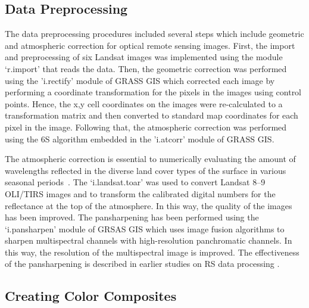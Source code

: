 \documentclass[geomatics,article,accept,pdftex,oneauthor]{Definitions/mdpi}
\begin{document}
\subsection{{Data Preprocessing}}
The data preprocessing procedures included several steps which include geometric and atmospheric correction for optical remote sensing images. First, the import and preprocessing of six Landsat images was implemented using the module `r.import' that reads the data. {Then, the} geometric correction was performed using the 'i.rectify' module of GRASS GIS which corrected each image by performing a coordinate transformation for the pixels in the images using control points. Hence, the x,y cell coordinates on the images were re-calculated to a transformation matrix and then converted to standard map coordinates for each pixel in the image. Following that, the atmospheric correction was performed using the 6S algorithm embedded in the 'i.atcorr' module of GRASS GIS. 

The atmospheric correction is essential to numerically evaluating the amount of wavelengths reflected in the diverse land cover types of the surface in various seasonal \mbox{periods \cite{f14071414,ABDELRAHMANHEGAB2024716}}. {The} `i.landsat.toar' was used to convert Landsat 8--9 OLI/TIRS images and to transform the calibrated digital numbers for the reflectance at the top of the atmosphere. In this way, the quality of the images has been improved. The pansharpening has been performed using the `i.pansharpen' module of GRSAS GIS which uses image fusion algorithms to sharpen multispectral channels with high-resolution panchromatic channels. In this way, the resolution of the multispectral image is improved. The effectiveness of the pansharpening is described in earlier studies on RS data processing \cite{rs15082017,rs13173433}.

\subsection{{Creating Color Composites}}
\end{document}
